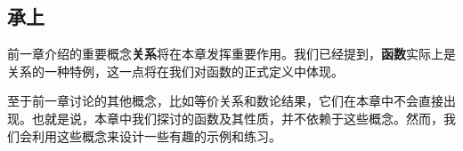 
\subsection{承上}

前一章介绍的重要概念\textbf{关系}将在本章发挥重要作用。我们已经提到，\textbf{函数}实际上是关系的一种特例，这一点将在我们对函数的正式定义中体现。

至于前一章讨论的其他概念，比如等价关系和数论结果，它们在本章中不会直接出现。也就是说，本章中我们探讨的函数及其性质，并不依赖于这些概念。然而，我们会利用这些概念来设计一些有趣的示例和练习。